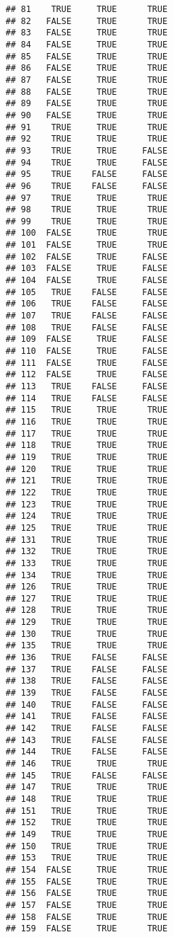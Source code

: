 \documentclass[
]{article}
\begin{document}
\begin{verbatim}
## 81    TRUE     TRUE      TRUE
## 82   FALSE     TRUE      TRUE
## 83   FALSE     TRUE      TRUE
## 84   FALSE     TRUE      TRUE
## 85   FALSE     TRUE      TRUE
## 86   FALSE     TRUE      TRUE
## 87   FALSE     TRUE      TRUE
## 88   FALSE     TRUE      TRUE
## 89   FALSE     TRUE      TRUE
## 90   FALSE     TRUE      TRUE
## 91    TRUE     TRUE      TRUE
## 92    TRUE     TRUE      TRUE
## 93    TRUE     TRUE     FALSE
## 94    TRUE     TRUE     FALSE
## 95    TRUE    FALSE     FALSE
## 96    TRUE    FALSE     FALSE
## 97    TRUE     TRUE      TRUE
## 98    TRUE     TRUE      TRUE
## 99    TRUE     TRUE      TRUE
## 100  FALSE     TRUE      TRUE
## 101  FALSE     TRUE      TRUE
## 102  FALSE     TRUE     FALSE
## 103  FALSE     TRUE     FALSE
## 104  FALSE     TRUE     FALSE
## 105   TRUE    FALSE     FALSE
## 106   TRUE    FALSE     FALSE
## 107   TRUE    FALSE     FALSE
## 108   TRUE    FALSE     FALSE
## 109  FALSE     TRUE     FALSE
## 110  FALSE     TRUE     FALSE
## 111  FALSE     TRUE     FALSE
## 112  FALSE     TRUE     FALSE
## 113   TRUE    FALSE     FALSE
## 114   TRUE    FALSE     FALSE
## 115   TRUE     TRUE      TRUE
## 116   TRUE     TRUE      TRUE
## 117   TRUE     TRUE      TRUE
## 118   TRUE     TRUE      TRUE
## 119   TRUE     TRUE      TRUE
## 120   TRUE     TRUE      TRUE
## 121   TRUE     TRUE      TRUE
## 122   TRUE     TRUE      TRUE
## 123   TRUE     TRUE      TRUE
## 124   TRUE     TRUE      TRUE
## 125   TRUE     TRUE      TRUE
## 131   TRUE     TRUE      TRUE
## 132   TRUE     TRUE      TRUE
## 133   TRUE     TRUE      TRUE
## 134   TRUE     TRUE      TRUE
## 126   TRUE     TRUE      TRUE
## 127   TRUE     TRUE      TRUE
## 128   TRUE     TRUE      TRUE
## 129   TRUE     TRUE      TRUE
## 130   TRUE     TRUE      TRUE
## 135   TRUE     TRUE      TRUE
## 136   TRUE    FALSE     FALSE
## 137   TRUE    FALSE     FALSE
## 138   TRUE    FALSE     FALSE
## 139   TRUE    FALSE     FALSE
## 140   TRUE    FALSE     FALSE
## 141   TRUE    FALSE     FALSE
## 142   TRUE    FALSE     FALSE
## 143   TRUE    FALSE     FALSE
## 144   TRUE    FALSE     FALSE
## 146   TRUE     TRUE      TRUE
## 145   TRUE    FALSE     FALSE
## 147   TRUE     TRUE      TRUE
## 148   TRUE     TRUE      TRUE
## 151   TRUE     TRUE      TRUE
## 152   TRUE     TRUE      TRUE
## 149   TRUE     TRUE      TRUE
## 150   TRUE     TRUE      TRUE
## 153   TRUE     TRUE      TRUE
## 154  FALSE     TRUE      TRUE
## 155  FALSE     TRUE      TRUE
## 156  FALSE     TRUE      TRUE
## 157  FALSE     TRUE      TRUE
## 158  FALSE     TRUE      TRUE
## 159  FALSE     TRUE      TRUE

\end{verbatim}
\end{document}
